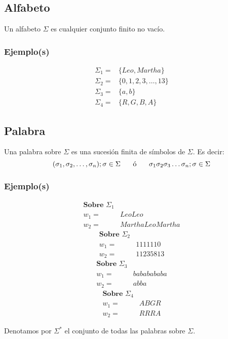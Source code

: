 \subsection{Alfabeto}
Un alfabeto $\Sigma$ es cualquier conjunto finito no vacío. 
\subsubsection{Ejemplo(s)}
\begin{align*}
\Sigma_1 =& \{ Leo, Martha \} \\
\Sigma_2 =& \{0,1,2,3,\ldots , 13\} \\
\Sigma_3 =& \{ a,b \} \\
\Sigma_4 =& \{ R,G,B,A\}
\end{align*}
\subsection{Palabra}
Una palabra sobre $\Sigma$ es una sucesión finita de símbolos de $\Sigma$. Es decir:
$$(\sigma_1,\sigma_2,\ldots,\sigma_n);\sigma \in \Sigma \text{\hspace{0.5cm}  ó  \hspace{0.5cm}} \sigma_1\sigma_2\sigma_3\ldots\sigma_n ; \sigma\in\Sigma$$
\subsubsection{Ejemplo(s)}
\noindent
\begin{multicols}{4}
\noindent
\begin{align*}
\textbf{Sobre } \Sigma_1& \\
w_1 =& LeoLeo \\
w_2 =& MarthaLeoMartha
\end{align*} 
\columnbreak
\begin{align*}
\textbf{Sobre } \Sigma_2& \\
w_1 =& 1111110 \\
w_2 =& 11235813
\end{align*}
\columnbreak
\begin{align*}
\textbf{Sobre } \Sigma_3& \\
w_1 =& bababababa \\
w_2 =& abba
\end{align*}
\columnbreak
\begin{align*}
\textbf{Sobre } \Sigma_4& \\
w_1 =& ABGR \\
w_2 =& RRRA
\end{align*}
\end{multicols}
Denotamos por $\Sigma^*$ el conjunto de todas las palabras sobre $\Sigma$.
